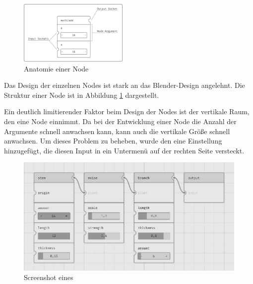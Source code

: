 \documentclass[ngerman]{article}
\begin{document}
\begingroup
\setlength\intextsep{4pt}
\begin{minipage}{\linewidth}
\begin{figure}
    \includegraphics[width=0.47\textwidth]{graphics/NODE_ANATOMY.pdf}
    \caption{Anatomie einer Node}
    \label{sec:NODE_ANATOMY}
\end{figure}

Das Design der einzelnen Nodes ist stark an das Blender-Design angelehnt. Die Struktur einer Node ist in Abbildung \ref{sec:NODE_ANATOMY} dargestellt. 

Ein deutlich limitierender Faktor beim Design der Nodes ist der vertikale Raum, den eine Node einnimmt. Da bei der Entwicklung einer Node die Anzahl der Argumente schnell anwachsen kann, kann auch die vertikale Größe schnell anwachsen. 
Um dieses Problem zu beheben, wurde den  eine Einstellung hinzugefügt, die diesen Input in ein Untermenü auf der rechten Seite versteckt. 
\end{minipage}
\br
\endgroup

\begin{figure}[htpb]
  \centering
  \includegraphics[width=1\textwidth]{graphics/node_graph.jpg}
  \caption{Screenshot eines }
  \label{fig:node_graph_screenshot}
\end{figure}

\pagebreak
\end{document}

